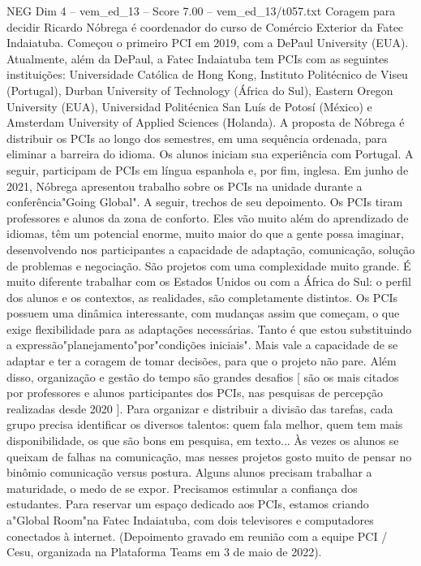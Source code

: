 \begin{textsample}{NEG Dim 4 – vem\_ed\_13 – Score 7.00 – vem\_ed\_13/t057.txt}  \label{ex:f4_neg_147}
Coragem para decidir Ricardo Nóbrega é coordenador do curso de Comércio Exterior da Fatec Indaiatuba.
Começou o primeiro PCI em 2019, com a DePaul University (EUA).
Atualmente, além da DePaul, a Fatec Indaiatuba tem PCIs com as seguintes instituições: Universidade Católica de Hong Kong, Instituto Politécnico de Viseu (Portugal), Durban University of Technology (África do Sul), Eastern Oregon University (EUA), Universidad Politécnica San Luís de Potosí (México) e Amsterdam University of Applied Sciences (Holanda).
A proposta de Nóbrega é distribuir os PCIs ao longo dos semestres, em uma sequência ordenada, para eliminar a barreira do idioma.
Os alunos iniciam sua experiência com Portugal.
A seguir, participam de PCIs em língua espanhola e, por fim, inglesa.
Em junho de 2021, Nóbrega apresentou trabalho sobre os PCIs na unidade durante a conferência"Going Global".
A seguir, trechos de seu depoimento.
Os PCIs tiram professores e alunos da zona de conforto.
Eles vão muito além do aprendizado de idiomas, têm um potencial enorme, muito maior do que a gente possa imaginar, desenvolvendo nos participantes a capacidade de adaptação, comunicação, solução de problemas e negociação.
São projetos com uma complexidade muito grande.
É muito diferente trabalhar com os Estados Unidos ou com a África do Sul: o perfil dos alunos e os contextos, as realidades, são completamente distintos.
Os PCIs possuem uma dinâmica interessante, com mudanças assim que começam, o que exige flexibilidade para as adaptações necessárias.
Tanto é que estou substituindo a expressão"planejamento"por"condições iniciais".
Mais vale a capacidade de se adaptar e ter a coragem de tomar decisões, para que o projeto não pare.
Além disso, organização e gestão do tempo são grandes desafios [ são os mais citados por professores e alunos participantes dos PCIs, nas pesquisas de percepção realizadas desde 2020 ].
Para organizar e distribuir a divisão das tarefas, cada grupo precisa identificar os diversos talentos: quem fala melhor, quem tem mais disponibilidade, os que são bons em pesquisa, em texto... Às vezes os alunos se queixam de falhas na comunicação, mas nesses projetos gosto muito de pensar no binômio comunicação versus postura.
Alguns alunos precisam trabalhar a maturidade, o medo de se expor.
Precisamos estimular a confiança dos estudantes.
Para reservar um espaço dedicado aos PCIs, estamos criando a"Global Room"na Fatec Indaiatuba, com dois televisores e computadores conectados à internet. (Depoimento gravado em reunião com a equipe PCI / Cesu, organizada na Plataforma Teams em 3 de maio de 2022).

\end{textsample}
